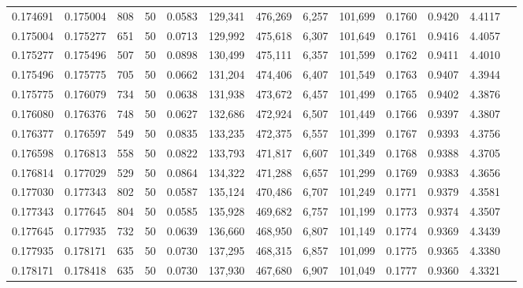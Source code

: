 \begin{tabular}{rrrrrrrrrrrrr}
0.174691 & 0.175004 &   808 &  50 &                                     0.0583 & 129,341 & 476,269 &   6,257 & 101,699 & 0.1760 & 0.9420 & 4.4117 \\
0.175004 & 0.175277 &   651 &  50 &                                     0.0713 & 129,992 & 475,618 &   6,307 & 101,649 & 0.1761 & 0.9416 & 4.4057 \\
0.175277 & 0.175496 &   507 &  50 &                                     0.0898 & 130,499 & 475,111 &   6,357 & 101,599 & 0.1762 & 0.9411 & 4.4010 \\
0.175496 & 0.175775 &   705 &  50 &                                     0.0662 & 131,204 & 474,406 &   6,407 & 101,549 & 0.1763 & 0.9407 & 4.3944 \\
0.175775 & 0.176079 &   734 &  50 &                                     0.0638 & 131,938 & 473,672 &   6,457 & 101,499 & 0.1765 & 0.9402 & 4.3876 \\
0.176080 & 0.176376 &   748 &  50 &                                     0.0627 & 132,686 & 472,924 &   6,507 & 101,449 & 0.1766 & 0.9397 & 4.3807 \\
0.176377 & 0.176597 &   549 &  50 &                                     0.0835 & 133,235 & 472,375 &   6,557 & 101,399 & 0.1767 & 0.9393 & 4.3756 \\
0.176598 & 0.176813 &   558 &  50 &                                     0.0822 & 133,793 & 471,817 &   6,607 & 101,349 & 0.1768 & 0.9388 & 4.3705 \\
0.176814 & 0.177029 &   529 &  50 &                                     0.0864 & 134,322 & 471,288 &   6,657 & 101,299 & 0.1769 & 0.9383 & 4.3656 \\
0.177030 & 0.177343 &   802 &  50 &                                     0.0587 & 135,124 & 470,486 &   6,707 & 101,249 & 0.1771 & 0.9379 & 4.3581 \\
0.177343 & 0.177645 &   804 &  50 &                                     0.0585 & 135,928 & 469,682 &   6,757 & 101,199 & 0.1773 & 0.9374 & 4.3507 \\
0.177645 & 0.177935 &   732 &  50 &                                     0.0639 & 136,660 & 468,950 &   6,807 & 101,149 & 0.1774 & 0.9369 & 4.3439 \\
0.177935 & 0.178171 &   635 &  50 &                                     0.0730 & 137,295 & 468,315 &   6,857 & 101,099 & 0.1775 & 0.9365 & 4.3380 \\
0.178171 & 0.178418 &   635 &  50 &                                     0.0730 & 137,930 & 467,680 &   6,907 & 101,049 & 0.1777 & 0.9360 & 4.3321 \\

\end{tabular}

